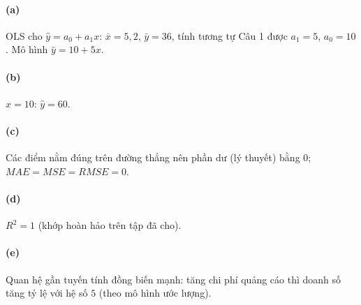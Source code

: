 \paragraph{(a)} OLS cho $\hat y=a_0+a_1x$: $\bar x=5{,}2$, $\bar y=36$, tính tương tự Câu 1 được $a_1=5$, $a_0=10$. Mô hình $\hat y=10+5x$.

\paragraph{(b)} $x=10$: $\hat y=60$.

\paragraph{(c)} Các điểm nằm đúng trên đường thẳng nên phần dư (lý thuyết) bằng $0$; $MAE=MSE=RMSE=0$.

\paragraph{(d)} $R^2=1$ (khớp hoàn hảo trên tập đã cho).

\paragraph{(e)} Quan hệ gần tuyến tính đồng biến mạnh: tăng chi phí quảng cáo thì doanh số tăng tỷ lệ với hệ số $5$ (theo mô hình ước lượng).
